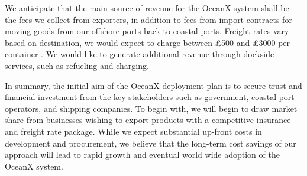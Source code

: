 We anticipate that the main source of revenue for the OceanX system shall be the fees we collect from exporters, in addition to fees from import contracts for moving goods from our offshore ports back to coastal ports. Freight rates vary based on destination, we would expect to charge between £500 and £3000 per container \cite{ContainerRates}. We would like to generate additional revenue through dockside services, such as refueling and charging. 

In summary, the initial aim of the OceanX deployment plan is to secure trust and financial investment from the key stakeholders such as government, coastal port operators, and shipping companies. To begin with, we will begin to draw market share from businesses wishing to export products with a competitive insurance and freight rate package. While we expect substantial up-front costs in development and procurement, we believe that the long-term cost savings of our approach will lead to rapid growth and eventual world wide adoption of the OceanX system.
